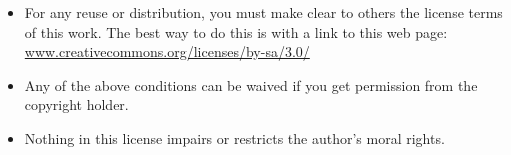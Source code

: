 \begin{footnotesize}
\begin{itemize}
  \item For any reuse or distribution, you must make clear to others the license terms of this work. The best way to do this is with a link to this web page: \\
  \url{www.creativecommons.org/licenses/by-sa/3.0/}
  \item Any of the above conditions can be waived if you get permission from the copyright holder.
  \item Nothing in this license impairs or restricts the author's moral rights.
\end{itemize}


\end{footnotesize}
\vfill

